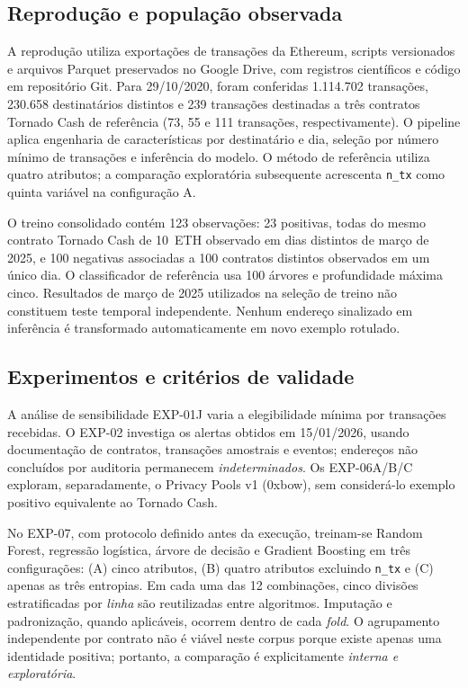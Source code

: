 \documentclass[12pt]{article}
\begin{document}
\subsection{Reprodução e população observada}
A reprodução utiliza exportações de transações da Ethereum, scripts versionados e arquivos Parquet preservados no Google Drive, com registros científicos e código em repositório Git. Para 29/10/2020, foram conferidas 1.114.702 transações, 230.658 destinatários distintos e 239 transações destinadas a três contratos Tornado Cash de referência (73, 55 e 111 transações, respectivamente). O pipeline aplica engenharia de características por destinatário e dia, seleção por número mínimo de transações e inferência do modelo. O método de referência utiliza quatro atributos; a comparação exploratória subsequente acrescenta \texttt{n\_tx} como quinta variável na configuração A.

O treino consolidado contém 123 observações: 23 positivas, todas do mesmo contrato Tornado Cash de 10~ETH observado em dias distintos de março de 2025, e 100 negativas associadas a 100 contratos distintos observados em um único dia. O classificador de referência usa 100 árvores e profundidade máxima cinco. Resultados de março de 2025 utilizados na seleção de treino não constituem teste temporal independente. Nenhum endereço sinalizado em inferência é transformado automaticamente em novo exemplo rotulado.

\subsection{Experimentos e critérios de validade}
A análise de sensibilidade EXP-01J varia a elegibilidade mínima por transações recebidas. O EXP-02 investiga os alertas obtidos em 15/01/2026, usando documentação de contratos, transações amostrais e eventos; endereços não concluídos por auditoria permanecem \emph{indeterminados}. Os EXP-06A/B/C exploram, separadamente, o Privacy Pools v1 (0xbow), sem considerá-lo exemplo positivo equivalente ao Tornado Cash.

No EXP-07, com protocolo definido antes da execução, treinam-se Random Forest, regressão logística, árvore de decisão e Gradient Boosting em três configurações: (A) cinco atributos, (B) quatro atributos excluindo \texttt{n\_tx} e (C) apenas as três entropias. Em cada uma das 12 combinações, cinco divisões estratificadas por \emph{linha} são reutilizadas entre algoritmos. Imputação e padronização, quando aplicáveis, ocorrem dentro de cada \emph{fold}. O agrupamento independente por contrato não é viável neste corpus porque existe apenas uma identidade positiva; portanto, a comparação é explicitamente \emph{interna e exploratória}.
\end{document}
